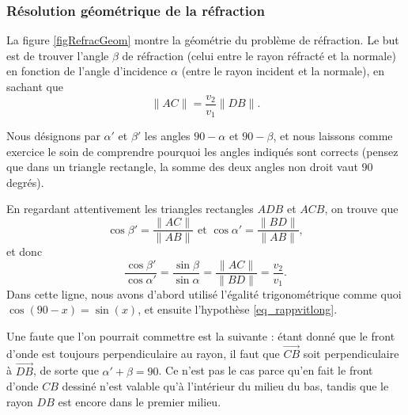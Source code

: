 \documentclass[a4paper,12pt]{book}
\theoremstyle{mes_exemples}	\newtheorem{exemple}[numtho]{Exemple}
\theoremstyle{mes_tho}
\begin{document}
\subsubsection{Résolution géométrique de la réfraction}

La figure \ref{figRefracGeom} montre la géométrie du problème de réfraction. Le but est de trouver l'angle $\beta$ de réfraction (celui entre le rayon réfracté et la normale) en fonction de l'angle d'incidence $\alpha$ (entre le rayon incident et la normale), en sachant que 
\begin{equation}  \label{eq_rappvitlong}
  \| AC \|=\frac{ v_{2} }{ v_{1} }\| DB \|.
\end{equation}


Nous désignons par $\alpha'$ et $\beta'$ les angles $90-\alpha$ et $90-\beta$, et nous laissons comme exercice le soin de comprendre pourquoi les angles indiqués sont corrects (pensez que dans un triangle rectangle, la somme des deux angles non droit vaut $90$ degrés). 

En regardant attentivement les triangles rectangles $ADB$ et $ACB$, on trouve que 
\[
  \cos\beta'=\frac{ \| AC\| }{ \| AB \| }\text{ et }
  \cos\alpha'=\frac{ \| BD \| }{ \| AB \| },
\]
et donc
\begin{equation}   \label{EqCossinVV}
\frac{ \cos\beta' }{ \cos\alpha' }=\frac{ \sin\beta }{ \sin\alpha }=\frac{ \| AC \| }{ \| BD \| }=\frac{ v_{2} }{ v_{1} }.
\end{equation}
Dans cette ligne, nous avons d'abord utilisé l'égalité trigonométrique comme quoi $\cos(90-x)=\sin(x)$, et ensuite l'hypothèse \eqref{eq_rappvitlong}. 

Une faute que l'on pourrait commettre est la suivante : étant donné que le front d'onde est toujours perpendiculaire au rayon, il faut que $\overrightarrow{CB}$ soit perpendiculaire à $\overrightarrow{DB}$, de sorte que $\alpha'+\beta=90$. Ce n'est pas le cas parce qu'en fait le front d'onde $CB$ dessiné n'est valable qu'à l'intérieur du milieu du bas, tandis que le rayon $DB$ est encore dans le premier milieu.
\end{document}
